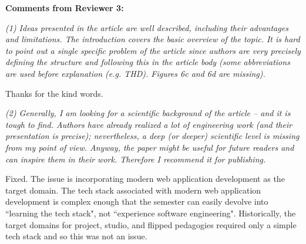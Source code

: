 \documentclass[12pt]{letter}
\begin{document}
\begin{letter}{}

{\bf Comments from Reviewer 3:}

{\em (1) Ideas presented in the article are well described, including their advantages and limitations. The introduction covers the basic overview of the topic. It is hard to point out a single specific problem of the article since authors are very precisely defining the structure and following this in the article body (some abbreviations are used before explanation (e.g. THD). Figures 6c and 6d are missing).}

Thanks for the kind words. 




{\em (2) Generally, I am looking for a scientific background of the article – and it is tough to find. Authors have already realized a lot of engineering work (and their presentation is precise); nevertheless, a deep (or deeper) scientific level is missing from my point of view. Anyway, the paper might be useful for future readers and can inspire them in their work. Therefore I recommend it for publishing.}


Fixed.  The issue is incorporating modern web application development as the target domain.  The tech stack associated with modern web application development is complex enough that the semester can easily devolve into ``learning the tech stack", not ``experience software engineering".  Historically, the target domains for project, studio, and flipped pedagogies required only a simple tech stack and so this was not an issue.


\end{letter}
\end{document}
